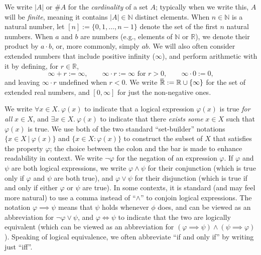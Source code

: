 We write $|A|$ or $\# A$ for the \emph{cardinality} of a set $A$;
    typically when we write this,  $A$ will be \emph{finite}, 
    meaning it contains $|A| \in \mathbb N$ distinct elements. 
When $n \in \mathbb N$ is a natural number, let
    $[n] := \{ 0, 1, \ldots, n-1 \}$ denote the set of the first $n$ natural numbers.
When $a$ and $b$ are numbers (e.g., elements of $\mathbb N$ or $\mathbb R$), we denote their product by $a \cdot b$, or, more commonly, simply $a b$.
We will also often consider extended numbers that include positive infinity ($\infty$), and perform arithmetic with it by defining, for $r \in \mathbb R$,
\[
    \infty + r := \infty,
    \qquad 
    \infty \cdot r := \infty \text{ for }r > 0,
    \qquad
    \infty \cdot 0 := 0,
\]
and leaving $\infty \cdot r$ undefined when $r < 0$. 
We write $\mskip1mu\overline{\mskip-1mu\mathbb R\!}\, := \mathbb R \cup \{\infty\}$ for the set of extended real numbers, and $[0, \infty]$ for just the non-negative ones. 


We write $\forall x \in X.~\varphi(x)$ to indicate that a logical expression $\varphi(x)$ is true \emph{for all} $x \in X$, and $\exists x \in X.~ \varphi(x)$ to indicate that there \emph{exists some} $x \in X$ such that $\varphi(x)$ is true.
We use both of the two standard ``set-builder'' notations 
$\{ x \in X ~|~ \varphi(x) \}$ 
    and
    $\{ x \in X : \varphi(x) \}$ 
    to construct the subset of $X$ that satisfies the property $\varphi$;
    the choice between the colon and the bar is made to enhance readability in context.
We write $\lnot\varphi$ for the negation of an expression $\varphi$. 
If $\varphi$ and $\psi$ are both logical expressions, we write $\varphi \land \psi$ for their conjunction (which is true only if $\varphi$ and $\psi$ are both true), and $\varphi \lor \psi$ for their disjunction (which is true if and only if either $\varphi$ or $\psi$ are true).
In some contexts, it is standard (and may feel more natural) to use a comma instead of ``$\land$'' to conjoin logical expressions. 
The notation $\varphi \implies \psi$ means that $\psi$ holds whenever $\phi$ does, and can be viewed as an abbreviation for $\lnot \varphi \lor \psi$, 
and $\varphi \iff \psi$ to indicate that the two are logically equivalent (which can be viewed as an abbreviation for $(\varphi \implies \psi) \land (\psi \implies \varphi)$).
Speaking of logical equivalence, we often abbreviate ``if and only if'' by writing just ``iff''. 



